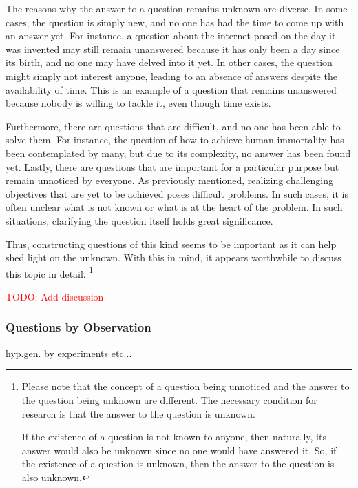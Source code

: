 The reasons why the answer to a question remains unknown are diverse. In some cases, the question is simply new, and no one has had the time to come up with an answer yet. For instance, a question about the internet posed on the day it was invented may still remain unanswered because it has only been a day since its birth, and no one may have delved into it yet. In other cases, the question might simply not interest anyone, leading to an absence of answers despite the availability of time. This is an example of a question that remains unanswered because nobody is willing to tackle it, even though time exists.

Furthermore, there are questions that are difficult, and no one has been able to solve them. For instance, the question of how to achieve human immortality has been contemplated by many, but due to its complexity, no answer has been found yet. Lastly, there are questions that are important for a particular purpose but remain unnoticed by everyone. As previously mentioned, realizing challenging objectives that are yet to be achieved poses difficult problems. In such cases, it is often unclear what is not known or what is at the heart of the problem. In such situations, clarifying the question itself holds great significance.

Thus, constructing questions of this kind seems to be important as it can help shed light on the unknown. With this in mind, it appears worthwhile to discuss this topic in detail. \footnote{
Please note that the concept of a question being unnoticed and the answer to the question being unknown are different. The necessary condition for research is that the answer to the question is unknown. 

If the existence of a question is not known to anyone, then naturally, its answer would also be unknown since no one would have answered it. So, if the existence of a question is unknown, then the answer to the question is also unknown.
}

\textcolor{red}{TODO: Add discussion}

\subsubsection{Questions by Observation}

hyp.gen. by experiments etc...



